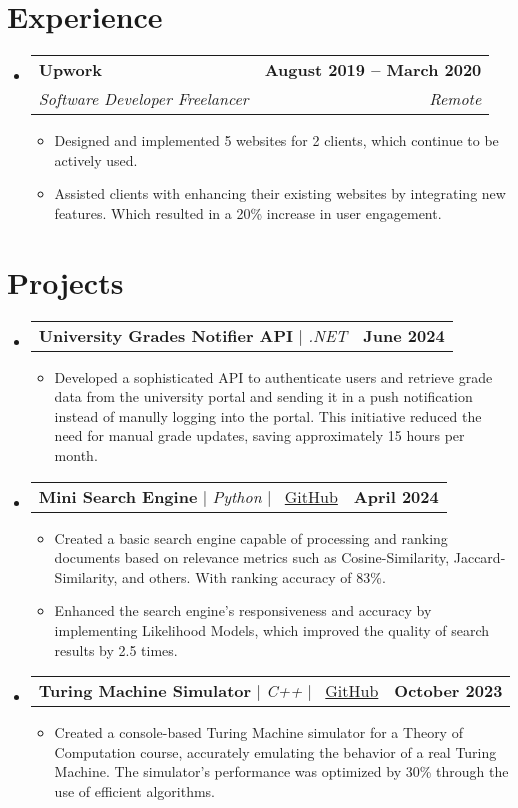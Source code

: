 \documentclass[letterpaper,11pt]{article}
\makeatletter
\newcommand{\resumeItem}[1]{
  \item\small{
    {#1 \vspace{-2pt}}
  }
}
\newcommand{\resumeSubheading}[4]{
  \vspace{-2pt}\item
    \begin{tabular*}{1.0\textwidth}[t]{l@{\extracolsep{\fill}}r}
      \textbf{#1} & \textbf{\small #2} \\
      \textit{\small#3} & \textit{\small #4} \\
    \end{tabular*}\vspace{-7pt}
}
\newcommand{\resumeProjectHeading}[2]{
    \item
    \begin{tabular*}{1.001\textwidth}{l@{\extracolsep{\fill}}r}
      \small#1 & \textbf{\small #2}\\
    \end{tabular*}\vspace{-7pt}
}
\newcommand{\resumeSubHeadingListStart}{\begin{itemize}[leftmargin=0.0in, label={}]}
\newcommand{\resumeSubHeadingListEnd}{\end{itemize}}
\newcommand{\resumeItemListStart}{\begin{itemize}}
\newcommand{\resumeItemListEnd}{\end{itemize}\vspace{-5pt}}
\makeatother
\begin{document}
\section{Experience}
  \resumeSubHeadingListStart

 
    \resumeSubheading
      {Upwork}{August 2019 -- March 2020}
      {Software Developer Freelancer}{Remote}
      \resumeItemListStart
        \resumeItem{Designed and implemented 5 websites for 2 clients, which continue to be actively used.}
        \resumeItem{Assisted clients with enhancing their existing websites by integrating new features. Which resulted in a 20\% increase in user engagement.}
      \resumeItemListEnd
  
  \resumeSubHeadingListEnd
\vspace{-16pt}


\section{Projects}
    \vspace{-5pt}
    \resumeSubHeadingListStart
      \resumeProjectHeading
          {\textbf{University Grades Notifier API} $|$ \emph{.NET}}{June 2024}
          \resumeItemListStart
            \resumeItem{Developed a sophisticated API to authenticate users and retrieve grade data from the university portal and sending it in a push notification instead of manully logging into the portal. This initiative reduced the need for manual grade updates, saving approximately 15 hours per month.}
          \resumeItemListEnd
          \vspace{-13pt}
     \resumeProjectHeading
{\textbf{Mini Search Engine} $|$ \emph{Python} $|$ \faGithub \ \href{https://github.com/MohamedWElteir/Search-Engine-In-Python}{GitHub}}{April 2024}
\resumeItemListStart
\resumeItem{Created a basic search engine capable of processing and ranking documents based on relevance metrics such as Cosine-Similarity, Jaccard-Similarity, and others. With ranking accuracy of 83\%.}
\resumeItem{Enhanced the search engine's responsiveness and accuracy by implementing Likelihood Models, which improved the quality of search results by 2.5 times.}
\resumeItemListEnd
          \vspace{-13pt}
          \resumeProjectHeading
{\textbf{Turing Machine Simulator} $|$ \emph{C++} $|$ \faGithub \ \href{https://github.com/MohamedWElteir/Turing-Machine-Simulator}{GitHub}}{October 2023}
\resumeItemListStart
\resumeItem{Created a console-based Turing Machine simulator for a Theory of Computation course, accurately emulating the behavior of a real Turing Machine. The simulator's performance was optimized by 30\% through the use of efficient algorithms.}
\resumeItemListEnd
    \resumeSubHeadingListEnd
\vspace{-15pt}
\end{document}
